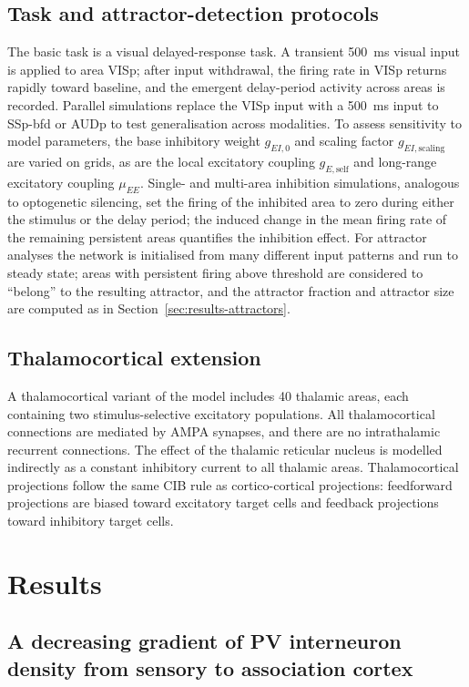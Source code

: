 \documentclass[11pt]{article}
\begin{document}
\subsection{Task and attractor-detection protocols}
The basic task is a visual delayed-response task. A transient 500~ms visual input is applied to area VISp; after input withdrawal, the firing rate in VISp returns rapidly toward baseline, and the emergent delay-period activity across areas is recorded. Parallel simulations replace the VISp input with a 500~ms input to SSp-bfd or AUDp to test generalisation across modalities. To assess sensitivity to model parameters, the base inhibitory weight $g_{EI,0}$ and scaling factor $g_{EI,\text{scaling}}$ are varied on grids, as are the local excitatory coupling $g_{E,\text{self}}$ and long-range excitatory coupling $\mu_{EE}$. Single- and multi-area inhibition simulations, analogous to optogenetic silencing, set the firing of the inhibited area to zero during either the stimulus or the delay period; the induced change in the mean firing rate of the remaining persistent areas quantifies the inhibition effect. For attractor analyses the network is initialised from many different input patterns and run to steady state; areas with persistent firing above threshold are considered to ``belong'' to the resulting attractor, and the attractor fraction and attractor size are computed as in Section~\ref{sec:results-attractors}.

\subsection{Thalamocortical extension}
A thalamocortical variant of the model includes 40 thalamic areas, each containing two stimulus-selective excitatory populations. All thalamocortical connections are mediated by AMPA synapses, and there are no intrathalamic recurrent connections. The effect of the thalamic reticular nucleus is modelled indirectly as a constant inhibitory current to all thalamic areas. Thalamocortical projections follow the same CIB rule as cortico-cortical projections: feedforward projections are biased toward excitatory target cells and feedback projections toward inhibitory target cells.

\section{Results}\label{sec:results}

\subsection{A decreasing gradient of PV interneuron density from sensory to association cortex}
\end{document}
